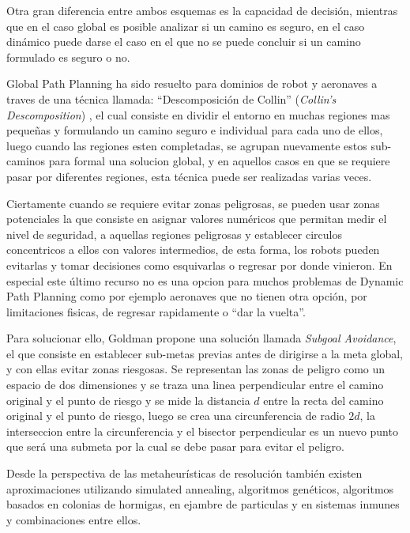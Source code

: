 Otra gran diferencia entre ambos esquemas es la capacidad de decisi\'on, mientras que en el caso global es posible analizar si un camino es seguro, en el caso din\'amico puede darse el caso en el que no se puede concluir si un camino formulado es seguro o no. \cite{Goldman94}

Global Path Planning ha sido resuelto para dominios de robot y aeronaves a traves de una t\'ecnica llamada: ``Descomposici\'on de Collin'' (\textit{Collin's Descomposition}) \cite{Latombe91}, el cual consiste en dividir el entorno en muchas regiones mas peque\~nas y formulando un camino seguro e individual para cada uno de ellos, luego cuando las regiones esten completadas, se agrupan nuevamente estos sub-caminos para formal una solucion global, y en aquellos casos en que se requiere pasar por diferentes regiones, esta t\'ecnica puede ser realizadas varias veces.\cite{Goldman94}

Ciertamente cuando se requiere evitar zonas peligrosas, se pueden usar zonas potenciales la que consiste en asignar valores num\'ericos que permitan medir el nivel de seguridad, a aquellas regiones peligrosas y establecer circulos concentricos a ellos con valores intermedios, de esta forma, los robots pueden evitarlas y tomar decisiones como esquivarlas o regresar por donde vinieron. En especial este \'ultimo recurso no es una opcion para muchos problemas de Dynamic Path Planning como por ejemplo aeronaves que no tienen otra opci\'on, por limitaciones fisicas, de regresar rapidamente o ``dar la vuelta''.

Para solucionar ello, Goldman propone una soluci\'on llamada \textit{Subgoal Avoidance}, el que consiste en establecer sub-metas previas antes de dirigirse a la meta global, y con ellas evitar zonas riesgosas. Se representan las zonas de peligro como un espacio de dos dimensiones y se traza una linea perpendicular entre el camino original y el punto de riesgo y se mide la distancia $d$ entre la recta del camino original y el punto de riesgo, luego se crea una circunferencia de radio $2d$, la interseccion entre la circunferencia y el bisector perpendicular es un nuevo punto que ser\'a una submeta por la cual se debe pasar para evitar el peligro.\cite{Goldman94}


Desde la perspectiva de las metaheur\'isticas de resoluci\'on tambi\'en existen aproximaciones utilizando simulated annealing, algoritmos gen\'eticos, algoritmos basados en colonias de hormigas, en ejambre de particulas y en sistemas inmunes y combinaciones entre ellos.

